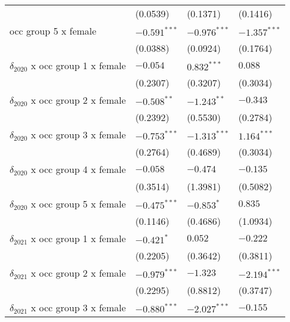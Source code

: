 \begin{tabular}{llll}
                                       &           (0.0539) &           (0.1371) &           (0.1416) \\
occ group 5 x female                   &     $-0.591^{***}$ &     $-0.976^{***}$ &     $-1.357^{***}$ \\
                                       &           (0.0388) &           (0.0924) &           (0.1764) \\
$\delta_{2020}$ x occ group 1 x female &           $-0.054$ &      $0.832^{***}$ &            $0.088$ \\
                                       &           (0.2307) &           (0.3207) &           (0.3034) \\
$\delta_{2020}$ x occ group 2 x female &      $-0.508^{**}$ &      $-1.243^{**}$ &           $-0.343$ \\
                                       &           (0.2392) &           (0.5530) &           (0.2784) \\
$\delta_{2020}$ x occ group 3 x female &     $-0.753^{***}$ &     $-1.313^{***}$ &      $1.164^{***}$ \\
                                       &           (0.2764) &           (0.4689) &           (0.3034) \\
$\delta_{2020}$ x occ group 4 x female &           $-0.058$ &           $-0.474$ &           $-0.135$ \\
                                       &           (0.3514) &           (1.3981) &           (0.5082) \\
$\delta_{2020}$ x occ group 5 x female &     $-0.475^{***}$ &         $-0.853^*$ &            $0.835$ \\
                                       &           (0.1146) &           (0.4686) &           (1.0934) \\
$\delta_{2021}$ x occ group 1 x female &         $-0.421^*$ &            $0.052$ &           $-0.222$ \\
                                       &           (0.2205) &           (0.3642) &           (0.3811) \\
$\delta_{2021}$ x occ group 2 x female &     $-0.979^{***}$ &           $-1.323$ &     $-2.194^{***}$ \\
                                       &           (0.2295) &           (0.8812) &           (0.3747) \\
$\delta_{2021}$ x occ group 3 x female &     $-0.880^{***}$ &     $-2.027^{***}$ &           $-0.155$ \\

\end{tabular}
